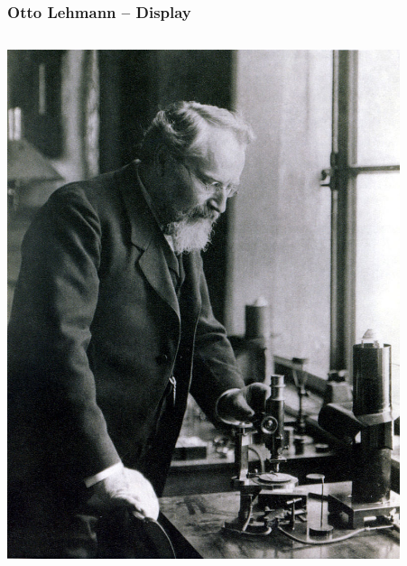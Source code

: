 \documentclass[14pt]{beamer}
\begin{document}
\begin{frame}
	\frametitle{Otto Lehmann -- Display}
	\begin{center}
		\begin{columns}
			\begin{column}{0.5\textwidth}
		\includegraphics[width=0.9\textwidth]{otto_lehmann.jpg}
			\end{column}
			\begin{column}{0.5\textwidth}

\end{column}
\end{columns}
\end{center}
\end{frame}
\end{document}
